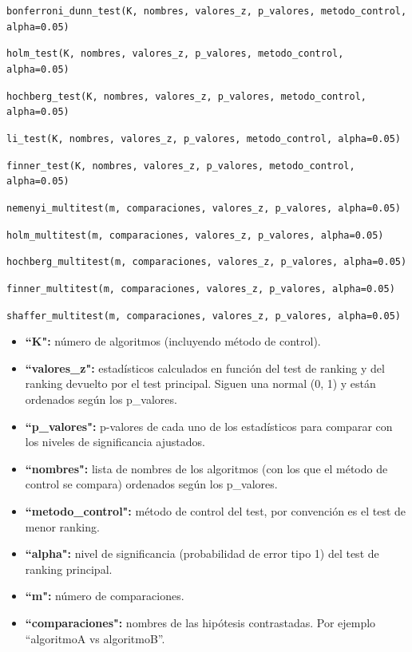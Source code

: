 \texttt{bonferroni\_dunn\_test(K, nombres, valores\_z, p\_valores, metodo\_control, alpha=0.05)}

\texttt{holm\_test(K, nombres, valores\_z, p\_valores, metodo\_control, alpha=0.05)}

\texttt{hochberg\_test(K, nombres, valores\_z, p\_valores, metodo\_control, alpha=0.05)}

\texttt{li\_test(K, nombres, valores\_z, p\_valores, metodo\_control, alpha=0.05)}

\texttt{finner\_test(K, nombres, valores\_z, p\_valores, metodo\_control, alpha=0.05)}

\texttt{nemenyi\_multitest(m, comparaciones, valores\_z, p\_valores, alpha=0.05)}

\texttt{holm\_multitest(m, comparaciones, valores\_z, p\_valores, alpha=0.05)}

\texttt{hochberg\_multitest(m, comparaciones, valores\_z, p\_valores, alpha=0.05)}

\texttt{finner\_multitest(m, comparaciones, valores\_z, p\_valores, alpha=0.05)}

\texttt{shaffer\_multitest(m, comparaciones, valores\_z, p\_valores, alpha=0.05)}

\begin{itemize}
\item \textbf{``K":} número de algoritmos (incluyendo método de control).
\item \textbf{``valores\_z":} estadísticos calculados en función del test de ranking y del ranking devuelto por el test principal. Siguen una normal (0, 1) y están ordenados según los p\_valores.
\item \textbf{``p\_valores":} p-valores de cada uno de los estadísticos para comparar con los niveles de significancia ajustados.
\item \textbf{``nombres":} lista de nombres de los algoritmos (con los que el método de control se compara) ordenados según los p\_valores.
\item \textbf{``metodo\_control":} método de control del test, por convención es el test de menor ranking.
\item \textbf{``alpha":} nivel de significancia (probabilidad de error tipo 1) del test de ranking principal.
\item \textbf{``m":} número de comparaciones.
\item \textbf{``comparaciones":} nombres de las hipótesis contrastadas. Por ejemplo “algoritmoA vs algoritmoB”.
\end{itemize}

